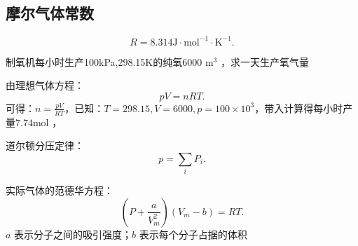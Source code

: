 \subsection{摩尔气体常数}%
\label{sub:摩尔气体常数}
 \[
    R=8.314\text{J} \cdot \text{mol}^{-1} \cdot \text{K}^{-1}
.\]
\begin{eg}
    制氧机每小时生产100kPa,298.15K的纯氧6000 $\text{m}^{3}$ ，求一天生产氧气量
\end{eg}
\begin{sol}
    由理想气体方程：\[
        pV=nRT
    .\]可得：$n=\frac{pV}{RT}$，已知：$T=298.15, V=6000, p=100\times 10^{3}$，带入计算得每小时产量$7.74\text{mol}$ ，
\end{sol}
\begin{notation}
    道尔顿分压定律： \[
        p=\sum_{i}P_i
    .\]
\end{notation}
\begin{notation}
    实际气体的范德华方程：
    \[
        \left( P+\frac{a}{V_{m}^2 } \right)\left( V_{m}-b \right)=RT
    .\]
    $a$ 表示分子之间的吸引强度；$b$ 表示每个分子占据的体积
\end{notation}
